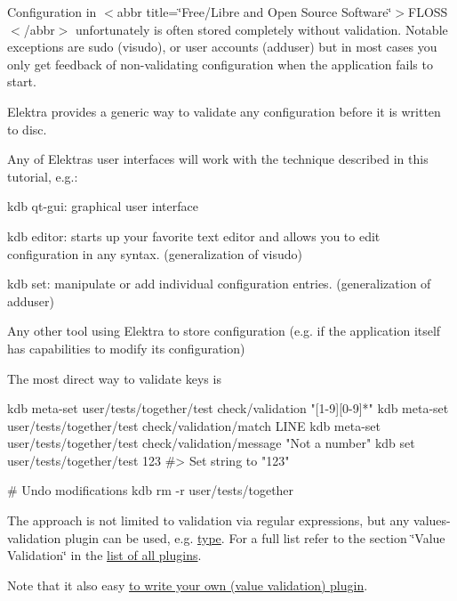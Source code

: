 Configuration in $<$abbr title=\char`\"{}\+Free/\+Libre and Open Source Software\char`\"{}$>$F\+L\+O\+SS$<$/abbr$>$ unfortunately is often stored completely without validation. Notable exceptions are sudo ({\ttfamily visudo}), or user accounts ({\ttfamily adduser}) but in most cases you only get feedback of non-\/validating configuration when the application fails to start.

Elektra provides a generic way to validate any configuration before it is written to disc.

Any of Elektra\textquotesingle{}s user interfaces will work with the technique described in this tutorial, e.\+g.\+:


\begin{DoxyEnumerate}
\item {\ttfamily kdb qt-\/gui}\+: graphical user interface
\item {\ttfamily kdb editor}\+: starts up your favorite text editor and allows you to edit configuration in any syntax. (generalization of {\ttfamily visudo})
\item {\ttfamily kdb set}\+: manipulate or add individual configuration entries. (generalization of {\ttfamily adduser})
\item Any other tool using Elektra to store configuration (e.\+g. if the application itself has capabilities to modify its configuration)
\end{DoxyEnumerate}

The most direct way to validate keys is


\begin{DoxyCode}
kdb meta-set user/tests/together/test check/validation "[1-9][0-9]*"
kdb meta-set user/tests/together/test check/validation/match LINE
kdb meta-set user/tests/together/test check/validation/message "Not a number"
kdb set user/tests/together/test 123
#> Set string to "123"

# Undo modifications
kdb rm -r user/tests/together
\end{DoxyCode}


The approach is not limited to validation via regular expressions, but any values-\/validation plugin can be used, e.\+g. \hyperlink{autotoc_md803_src_plugins_type_README_md}{type}. For a full list refer to the section \char`\"{}\+Value Validation\char`\"{} in the \hyperlink{src_plugins_README_md}{list of all plugins}.

Note that it also easy \hyperlink{doc_tutorials_plugins_md}{to write your own (value validation) plugin}.

